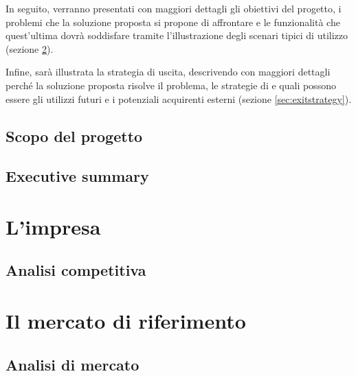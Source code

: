In seguito, verranno presentati con maggiori dettagli gli obiettivi del progetto, i problemi che la soluzione proposta si propone di affrontare e le funzionalità che quest'ultima dovrà soddisfare tramite l'illustrazione degli scenari tipici di utilizzo (sezione \ref{sec:whattheproblemis}).
 
Infine, sarà illustrata la strategia di uscita, descrivendo con maggiori dettagli perché la soluzione proposta risolve il problema, le strategie di \mktg e quali possono essere gli utilizzi futuri e i potenziali acquirenti esterni (sezione \ref{sec:exitstrategy}).

\subsection{Scopo del progetto}

\subsection{Executive summary}

\section{L'impresa}\label{sec:whoweare}

\subsection{Analisi competitiva}

\section{Il mercato di riferimento}\label{sec:whattheproblemis}
\subsection{Analisi di mercato}

